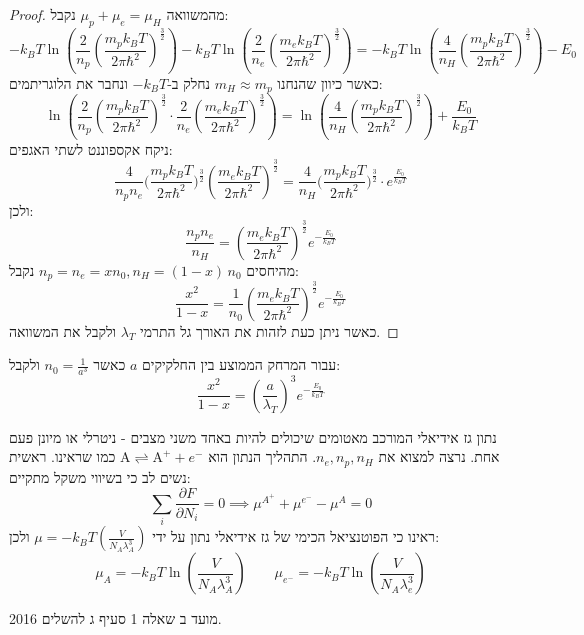\documentclass{tstextbook}
\begin{document}
\begin{proof}
מהמשוואה \(\mu_{p}+\mu_{e}=\mu_{H}\) נקבל:
$$-k_{B}T \ln\left(\frac{2}{n_{p}}\left(\frac{m_{p}k_{B}T}{2\pi\hbar^{2}}\right)^{\frac{3}{2}}\right)-k_{B}T \ln\left(\frac{2}{n_{e}}\left(\frac{m_{e}k_{B}T}{2\pi\hbar^{2}}\right)^{\frac{3}{2}}\right)=-k_{B}T \ln\left(\frac{4}{n_{H}}\left(\frac{m_{p}k_{B}T}{2\pi\hbar^{2}}\right)^{\frac{3}{2}}\right)-E_{0}$$
כאשר כיוון שהנחנו \(m_{H}\approx m_{p}\) נחלק ב-\(-k_{B}T\) ונחבר את הלוגריתמים:
$$\ln\left(\frac{2}{n_{p}}\left(\frac{m_{p}k_{B}T}{2\pi\hbar^{2}}\right)^{\frac{3}{2}}\cdot\frac{2}{n_{e}}\left(\frac{m_{e}k_{B}T}{2\pi\hbar^{2}}\right)^{\frac{3}{2}}\right)=\ln\left(\frac{4}{n_{H}}\left(\frac{m_{p}k_{B}T}{2\pi\hbar^{2}}\right)^{\frac{3}{2}}\right)+\frac{E_{0}}{k_{B}T}$$
ניקח אקספוננט לשתי האגפים:
$${\frac{4}{n_{p}n_{e}}}{\bigg(}{\frac{m_{p}k_{B}T}{2\pi\hbar^{2}}}{\bigg)}^{\frac{3}{2}}\left({\frac{m_{e}k_{B}T}{2\pi\hbar^{2}}}\right)^{\frac{3}{2}}={\frac{4}{n_{H}}}{\bigg(}{\frac{m_{p}k_{B}{T}}{2\pi\hbar^{2}}}{\bigg)}^{\frac{3}{2}}\cdot e^{\frac{E_{0}}{k_{B}T}}$$
ולכן:
$$\frac{n_{p}n_{e}}{n_{H}}=\left(\frac{m_{e}k_{B}T}{2\pi\hbar^{2}}\right)^{\frac{3}{2}}e^{-\frac{E_{0}}{k_{B}T}}$$
מהיחסים \(n_{p}=n_{e}=x n_{0},n_{H}=(1-x)\,n_{0}\) נקבל:
$$\frac{x^{2}}{1-x}=\frac{1}{n_{0}}\left(\frac{m_{e}k_{B}T}{2\pi\hbar^{2}}\right)^{\frac{3}{2}}e^{-\frac{E_{0}}{k_{B}T}}$$
כאשר ניתן כעת לזהות את האורך גל התרמי \(\lambda_{T}\) ולקבל את המשוואה.

\end{proof}
\begin{corollary}
עבור המרחק הממוצע בין החלקיקים \(a\) כאשר \(n_{0}=\frac{1}{a^{3}}\) ולקבל:
$$\frac{x^{2}}{1-x}=\left(\frac{a}{\lambda_{T}}\right)^{3}e^{-\frac{E_{0}}{k_{B}T}}$$

\end{corollary}
\begin{example}
נתון גז אידיאלי המורכב מאטומים שיכולים להיות באחד משני מצבים - ניטרלי או מיונן פעם אחת. נרצה למצוא את \(n_{e},n_{p},n_{H}\).
התהליך הנתון הוא \(\mathrm{\mathrm{A}}\rightleftharpoons\mathrm{\mathrm{A}}^{+}+e^{-}\) כמו שראינו. ראשית נשים לב כי בשיווי משקל מתקיים:
$$\sum_{i}\frac{\partial F}{\partial N_{i}}=0\implies \mu^{A^{+}}+\mu^{e^{-}}-\mu^{A}=0$$
ראינו כי הפוטנציאל הכימי של גז אידיאלי נתון על ידי \(\mu=-k_{B}T\left( \frac{V}{N_{A}\lambda_{A}^{3}} \right)\) ולכן:
$$\mu_{A}=-k_{B}T\ln\left( \frac{V}{N_{A}\lambda_{A}^{3}} \right)\qquad \mu_{e^{-}}=-k_{B}T\ln\left( \frac{V}{N_{A}\lambda_{e}^{3}} \right)$$

2016 מועד ב שאלה 1 סעיף ג להשלים. 

\end{example}
\end{document}
